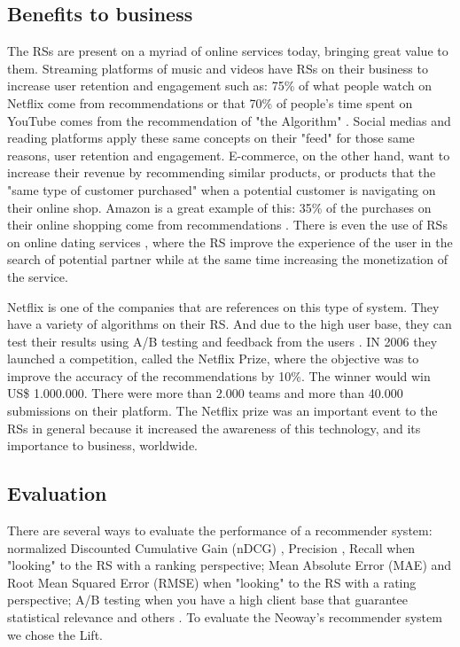 \subsection{Benefits to business}

The RSs are present on a myriad of online services today, bringing great value to them. Streaming platforms of music and videos have RSs on their business to increase user retention and engagement such as: 75\% of what people watch on Netflix come from recommendations \cite{HowretailerscankeepupwithconsumersMcKinsey} or that 70\% of people's time spent on YouTube comes from the recommendation of "the Algorithm" \cite{CES2018YouTubesAIrecommendationsdrive70percentofviewingCNET}. Social medias and reading platforms apply these same concepts on their "feed" for those same reasons, user retention and engagement. E-commerce, on the other hand, want to increase their revenue by recommending similar products, or products that the "same type of customer purchased" when a potential customer is navigating on their online shop. Amazon is a great example of this: 35\% of the purchases on their online shopping come from recommendations \cite{HowretailerscankeepupwithconsumersMcKinsey}. There is even the use of RSs on online dating services \cite{brozovsky2007recommender}, where the RS improve the experience of the user in the search of potential partner while at the same time increasing the monetization of the service.

Netflix is one of the companies that are references on this type of system. They have a variety of algorithms on their RS. And due to the high user base, they can test their results using A/B testing and feedback from the users \cite{gomez2016netflix}. IN 2006 they launched a competition, called the Netflix Prize, where the objective was to improve the accuracy of the recommendations by 10\%. The winner would win US\$ 1.000.000. There were more than 2.000 teams and more than 40.000 submissions on their platform. The Netflix prize was an important event to the RSs in general because it increased the awareness of this technology, and its importance to business, worldwide. 

\subsection{Evaluation}
\label{ch:evaluation}

There are several ways to evaluate the performance of a recommender system: normalized Discounted Cumulative Gain (nDCG) \cite{jarvelin2002cumulated}, Precision \cite{Precision-rs-metric}, Recall \cite{cremonesi2010performance} when "looking" to the RS with a ranking perspective; Mean Absolute Error (MAE) \cite{breese1998empirical} and Root Mean Squared Error (RMSE) \cite{bennett2007netflix} when "looking" to the RS with a rating perspective; A/B testing when you have a high client base that guarantee statistical relevance and others \cite{parra2013recommender}. To evaluate the Neoway's recommender system we chose the Lift.

